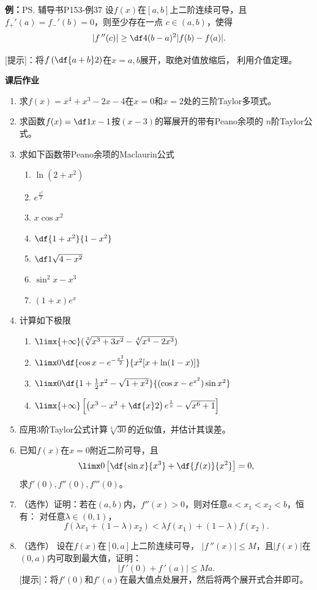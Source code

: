 {\bf 例：}\ps{辅导书P153-例37}
设$f(x)$在$[a,b]$上二阶连续可导，且$f_+'(a)=f_-'(b)=0$，则至少存在一点
$c\in(a,b)$，使得
$$|f\,''(c)|\geq \df 4{(b-a)^2}|f(b)-f(a)|.$$

[提示]：将$f\left(\df{a+b}2\right)$在$x=a,b$展开，取绝对值放缩后，
利用介值定理。

\begin{ext}
	{\bf 课后作业}
	
	\begin{enumerate}
	  \item 求$f(x)=x^4+x^3-2x-4$在$x=0$和$x=2$处的三阶Taylor多项式。
	  \item 求函数$f(x)=\df1{x-1}$按$(x-3)$的幂展开的带有Peano余项的
	  $n$阶Taylor公式。
	  \item 求如下函数带Peano余项的Maclaurin公式
		\begin{enumerate}[(1)]
		  \item $\ln(2+x^2)$
		  \item $e^{\frac{x^2}2}$
		  \item $x\cos x^2$
		  \item $\df{1+x^2}{1-x^2}$
		  \item $\df1{\sqrt{4-x^2}}$
		  \item $\sin^2x-x^3$
		  \item $(1+x)e^{x}$
		\end{enumerate}
	  \item 计算如下极限
	  \begin{enumerate}[(1)]
		\item $\limx{+\infty}(\sqrt[3]{x^3+3x^2}-\sqrt[4]{x^4-2x^3})$
		\item $\limx0\df{\cos x-e^{-\frac{x^2}2}}{x^2[x+\ln(1-x)]}$
		\item $\limx0\df{1+\frac12x^2-\sqrt{1+x^2}}{(\cos x-e^{x^2})\sin x^2}$
		\item $\limx{+\infty}\left[\left(x^3-x^2+\df{x}2\right)e^{\frac1x}
		-\sqrt{x^6+1}\right]$
	  \end{enumerate}
	  \item 应用$3$阶Taylor公式计算$\sqrt[3]{30}$的近似值，并估计其误差。
	  \item 已知$f(x)$在$x=0$附近二阶可导，且
	  $$\limx0\left[\df{\sin x}{x^3}+\df{f(x)}{x^2}\right]=0,$$
	  求$f'(0),f''(0),f'''(0)$。
	  \item （选作）证明：若在$(a,b)$内，$f''(x)>0$，则对任意$a<x_1<x_2<b$，恒有：
	  对任意$\lambda\in(0,1)$，
		$$f(\lambda x_1+(1-\lambda)x_2)<\lambda
		f(x_1)+(1-\lambda)f(x_2).$$
	  \item （选作） 设在$f(x)$在$[0,a]$上二阶连续可导，
		$|f\,''(x)|\leq M$，且$|f(x)|$在$(0,a)$内可取到最大值，证明：
		$$|f\,'(0)+f\,'(a)|\leq Ma.$$		
		[提示]：将$f'(0)$和$f'(a)$在最大值点处展开，然后将两个展开式合并即可。
	\end{enumerate}
\end{ext}


